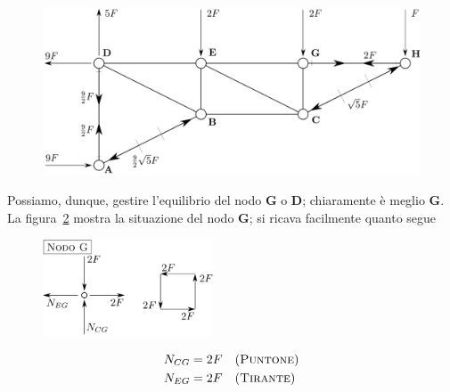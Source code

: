 \renewcommand{\thefigure}{9.1~-~4}
\begin{figure}[ht]
\centering
\includegraphics[width=\textwidth]{Immagini/Parte_9/Esercizio9_1/Esercizio9_1_4.pdf}
\caption{}
\label{Esercizio9-1-4}
\end{figure}
Possiamo, dunque, gestire l'equilibrio del nodo $\mathbf{G}$ o $\mathbf{D}$; chiaramente è meglio $\mathbf{G}$. La figura~\ref{Esercizio9-1-5} mostra la situazione del nodo $\mathbf{G}$; si ricava facilmente quanto segue
\renewcommand{\thefigure}{9.1~-~5}
\begin{figure}[ht]
\centering
\includegraphics[width=0.45\textwidth]{Immagini/Parte_9/Esercizio9_1/Esercizio9_1_5.pdf}
\caption{}
\label{Esercizio9-1-5}
\end{figure}
\begin{align*}
N_{CG} &= 2F \quad (\textup{\textsc{Puntone}}) \\
N_{EG} &= 2F \quad (\textup{\textsc{Tirante}}) 
\end{align*}
